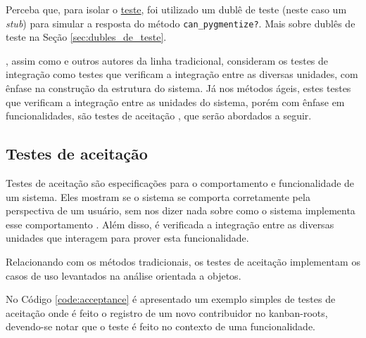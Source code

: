 Perceba que, para isolar o \hyperref[code:integration_spec]{teste}, foi utilizado um dublê de teste (neste caso um \textit{stub}) para simular a resposta do método \texttt{can\_pygmentize?}. Mais sobre dublês de teste na Seção \ref{sec:dubles_de_teste}.

, assim como  e outros autores da linha tradicional, consideram os testes de integração como testes que verificam a integração entre as diversas unidades, com ênfase na construção da estrutura do sistema. Já nos métodos ágeis, estes testes que verificam a integração entre as unidades do sistema, porém com ênfase em funcionalidades, são testes de aceitação \cite{XPTeles}, que serão abordados a seguir.


\subsection{Testes de aceitação}
\label{ssub:testes_de_aceitacao}

Testes de aceitação são especificações para o comportamento e funcionalidade de um sistema. Eles mostram se o sistema se comporta corretamente pela perspectiva de um usuário, sem nos dizer nada sobre como o sistema implementa esse comportamento \cite{TestDrivenKoskela}. Além disso, é verificada a integração entre as diversas unidades que interagem para prover esta funcionalidade.

Relacionando com os métodos tradicionais, os testes de aceitação implementam os casos de uso levantados na análise orientada a objetos.

No Código \ref{code:acceptance} é apresentado um exemplo simples de testes de aceitação onde é feito o registro de um novo contribuidor no kanban-roots, devendo-se notar que o teste é feito no contexto de uma funcionalidade.

